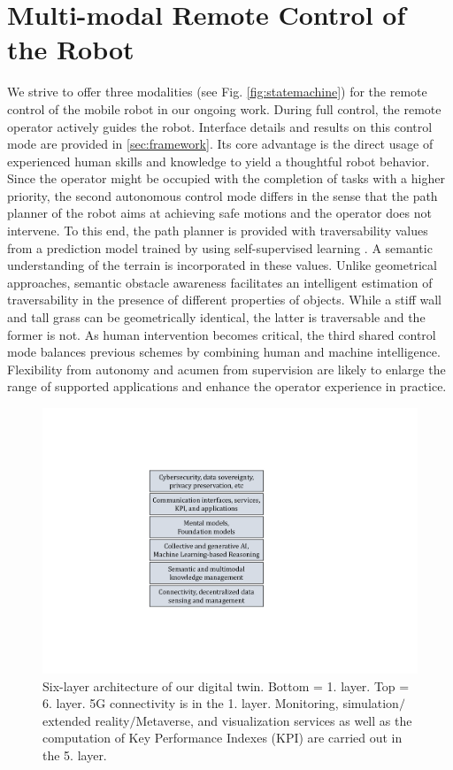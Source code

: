 \documentclass[letterpaper, 10 pt, conference]{ieeeconf}  %
\begin{document}
\section{Multi-modal Remote Control of the Robot}
We strive to offer three modalities (see Fig. \ref{fig:statemachine}) for the remote control of the mobile robot in our ongoing work. During  full control, the remote operator actively guides the robot. Interface details and  results on this control mode are provided in  \cref{sec:framework}. Its core advantage is the direct usage of experienced human skills and knowledge to yield a thoughtful robot behavior. Since the operator might be occupied with the completion of  tasks with a higher priority, the second autonomous control mode differs  in the sense that the path planner of the robot aims at achieving safe motions and the operator does not intervene. To this end, the path planner is provided with traversability values from a prediction model trained by using self-supervised learning \cite{wayfaster}. A semantic understanding of the terrain  is incorporated in these values. Unlike geometrical approaches, semantic obstacle awareness facilitates an intelligent estimation of traversability in the presence of  different properties of objects. While a stiff wall and tall grass can be geometrically identical, the latter is traversable and the former is not. As human intervention becomes critical, the third shared control mode balances previous schemes by combining human and machine intelligence. Flexibility from autonomy and acumen from supervision are likely to enlarge the range of supported applications and enhance the operator experience in practice.




\begin{figure}[t]
	\centerline{\includegraphics[width=0.45\columnwidth]{images/DT.pdf}}
	\caption{Six-layer architecture of our digital twin. Bottom = 1. layer. Top = 6. layer. 5G connectivity is in the 1. layer. Monitoring, simulation$\slash$extended reality$\slash$Metaverse, and visualization services as well as the computation of Key Performance Indexes (KPI) are carried out in the 5. layer. }
	\label{fig:DT}
\end{figure}
\end{document}
